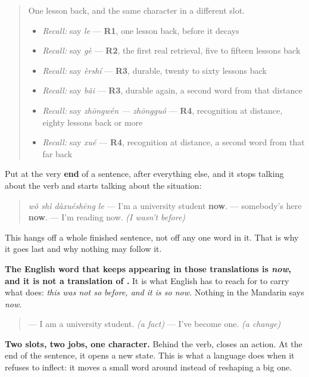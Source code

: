 \label{lesson:ZH-C25-le-juwei}



\begin{quote}
One lesson back, and the same character in a different slot.

\begin{itemize}
\raggedright
  \item \emph{Recall:} say \emph{le} — \textbf{R1}, one lesson back, before it decays
  \item \emph{Recall:} say \emph{gè} — \textbf{R2}, the first real retrieval, five to fifteen lessons back
  \item \emph{Recall:} say \emph{èrshí} — \textbf{R3}, durable, twenty to sixty lessons back
  \item \emph{Recall:} say \emph{bǎi} — \textbf{R3}, durable again, a second word from that distance
  \item \emph{Recall:} say \emph{zhōngwén — zhōngguó} — \textbf{R4}, recognition at distance, eighty lessons back or more
  \item \emph{Recall:} say \emph{xué} — \textbf{R4}, recognition at distance, a second word from that far back
\end{itemize}
\end{quote}

\begin{grammarlens}[title={Grammar Lens: \zh{了} at the end says the situation is new}]
Put  at the very \textbf{end} of a sentence, after everything else, and it stops talking about the verb and starts talking about the situation:

\begin{quote}
\textbf{} \emph{wǒ shì dàxuéshēng le} — I'm a university student \textbf{now}. \textbf{} — somebody's here \textbf{now}. \textbf{} — I'm reading now. \emph{(I wasn't before)}
\end{quote}

This  hangs off a whole finished sentence, not off any one word in it. That is why it goes last and why nothing may follow it.

\textbf{The English word that keeps appearing in those translations is \emph{now}, and it is not a translation of .} It is what English has to reach for to carry what  does: \emph{this was not so before, and it is so now.} Nothing in the Mandarin says \emph{now}.

\begin{quote}
\textbf{} — I am a university student. \emph{(a fact)} \textbf{} — I've become one. \emph{(a change)}
\end{quote}

\textbf{Two slots, two jobs, one character.} Behind the verb,  closes an action. At the end of the sentence, it opens a new state. This is what a language does when it refuses to inflect: it moves a small word around instead of reshaping a big one.
\end{grammarlens}

